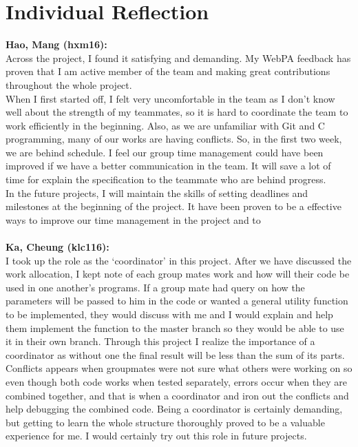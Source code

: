 \documentclass[11pt]{article}
\begin{document}
\section{Individual Reflection}
\textbf{Hao, Mang (hxm16):}
\\ Across the project, I found it satisfying and demanding. My WebPA feedback has proven that I am active member of the team and making great contributions throughout the whole project.
\\When I first started off, I felt very uncomfortable in the team  as I don't know well about the strength of my teammates, so it is hard to coordinate the team to work efficiently in the beginning. Also, as we are unfamiliar with Git and C programming, many of our works are having conflicts. So, in the first two week, we are behind schedule. I feel our group time management could have been improved if we have a better communication in the team. It will save a lot of time for explain the specification to the teammate who are behind progress.
\\In the future projects, I will maintain the skills of setting deadlines and milestones at the beginning of the project. It have been proven to be a effective ways to improve our time management in the project and to 
\\
\\
\textbf{Ka, Cheung (klc116):}
\\I took up the role as the ‘coordinator’ in this project. After we have discussed the work allocation, I kept note of each group mates work and how will their code be used in one another’s programs. If a group mate had query on how the parameters will be passed to him in the code or wanted a general utility function to be implemented, they would discuss with me and I would explain and help them implement the function to the master branch so they would be able to use it in their own branch. Through this project I realize the importance of a coordinator as without one the final result will be less than the sum of its parts. Conflicts appears when groupmates were not sure what others were working on so even though both code works when tested separately, errors occur when they are combined together, and that is when a coordinator and iron out the conflicts and help debugging the combined code. Being a coordinator is certainly demanding, but getting to learn the whole structure thoroughly proved to be a valuable experience for me. I would certainly try out this role in future projects.  
\\
\\
\end{document}
